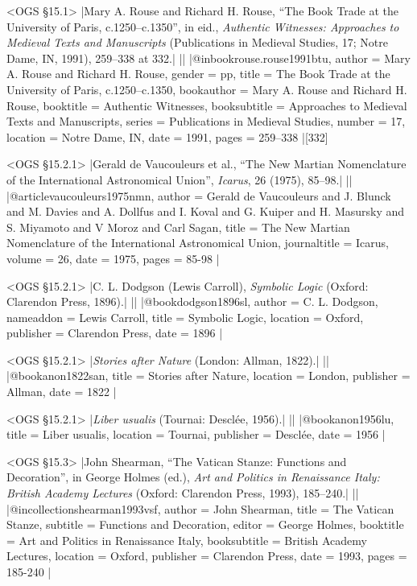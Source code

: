 \documentclass[extrafontsizes,11pt,a4paper,oneside]{memoir}
\begin{document}
\bibexample<OGS \S15.1>
|Mary A. Rouse and Richard H. Rouse, \enquote{The Book Trade at the University of Paris, c.1250--c.1350}, in eid., \emph{Authentic Witnesses: Approaches to Medieval Texts and Manuscripts} (Publications in Medieval Studies, 17; Notre Dame, IN, 1991), 259--338 at 332.|%
||%
|@inbook{rouse.rouse1991btu,
  author = {Mary A. Rouse and Richard H. Rouse},
  gender = {pp},
  title = {The Book Trade at the University of Paris, c.1250--c.1350},
  bookauthor = {Mary A. Rouse and Richard H. Rouse},
  booktitle = {Authentic Witnesses},
  booksubtitle = {Approaches to Medieval Texts and Manuscripts},
  series = {Publications in Medieval Studies},
  number = {17},
  location = {Notre Dame, IN},
  date = {1991},
  pages = {259--338}
}|[332]


\bibexample<OGS \S15.2.1>
|Gerald de Vaucouleurs et al., \enquote{The New Martian Nomenclature of the International Astronomical Union}, \emph{Icarus}, 26 (1975), 85--98.|%
||%
|@article{vaucouleurs1975nmn,
  author = {Gerald de Vaucouleurs and J. Blunck and M. Davies and A. Dollfus and I. Koval and G. Kuiper and H. Masursky and S. Miyamoto and V Moroz and Carl Sagan},
  title = {The New {Martian} Nomenclature of the {International} {Astronomical} {Union}},
  journaltitle = {Icarus},
  volume = {26},
  date = {1975},
  pages = {85-98}
}|


\bibexample<OGS \S15.2.1>
|C. L. Dodgson (Lewis Carroll), \emph{Symbolic Logic} (Oxford: Clarendon Press, 1896).|%
||%
|@book{dodgson1896sl,
  author = {C. L. Dodgson},
  nameaddon = {Lewis Carroll},
  title = {Symbolic Logic},
  location = {Oxford},
  publisher = {Clarendon Press},
  date = {1896}
}|

\bibexample<OGS \S15.2.1>
|\emph{Stories after Nature} (London: Allman, 1822).|%
||%
|@book{anon1822san,
  title = {Stories after Nature},
  location = {London},
  publisher = {Allman},
  date = {1822}
}|

\bibexample<OGS \S15.2.1>
|\emph{Liber usualis} (Tournai: Desclée, 1956).|%
||%
|@book{anon1956lu,
  title = {Liber usualis},
  location = {Tournai},
  publisher = {Desclée},
  date = {1956}
}|





\bibexample<OGS \S15.3>
|John Shearman, \enquote{The Vatican Stanze: Functions and Decoration}, in George Holmes (ed.), \emph{Art and Politics in Renaissance Italy: British Academy Lectures} (Oxford: Clarendon Press, 1993), 185--240.|%
||%
|@incollection{shearman1993vsf,
  author = {John Shearman},
  title = {The Vatican Stanze},
  subtitle = {Functions and Decoration},
  editor = {George Holmes},
  booktitle = {Art and Politics in Renaissance Italy},
  booksubtitle = {British Academy Lectures},
  location = {Oxford},
  publisher = {Clarendon Press},
  date = {1993},
  pages = {185-240}
}|
\end{document}
